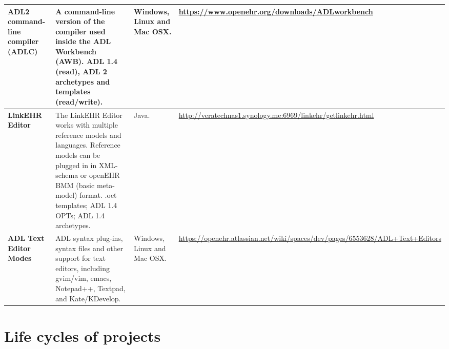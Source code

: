 \documentclass[mim_thesis.tex]{subfiles}
\begin{document}
\begin{table}[H]
\begin{tabular}{p{3.5cm} p{5cm} p{2cm} p{4cm}}
\textbf{ADL2 command-line compiler (ADLC)} & A command-line version of the compiler used inside the ADL Workbench (AWB). ADL 1.4 (read), ADL 2 archetypes and templates (read/write).                                                                                                                                                                                                & Windows, Linux and Mac OSX. & \url{https://www.openehr.org/downloads/ADLworkbench}                                                            \\ \midrule
\textbf{LinkEHR Editor}                    & The LinkEHR Editor works with multiple reference models and languages. Reference models can be plugged in in XML-schema or openEHR BMM (basic meta-model) format. .oet templates; ADL 1.4 OPTs; ADL 1.4 archetypes.                                                                                                                     & Java.                       & \url{http://veratechnas1.synology.me:6969/linkehr/getlinkehr.html}                                              \\ \midrule
\textbf{ADL Text Editor Modes}             & ADL syntax plug-ins, syntax files and other support for text editors, including gvim/vim, emacs, Notepad++, Textpad, and Kate/KDevelop.                                                                                                                                                                                                 & Windows, Linux and Mac OSX. & \url{https://openehr.atlassian.net/wiki/spaces/dev/pages/6553628/ADL+Text+Editors}                              \\ \bottomrule[2pt]
\end{tabular}
\end{table}


\section{Life cycles of projects}
\end{document}
